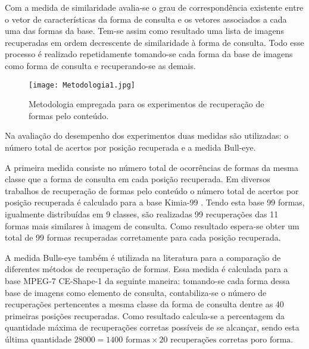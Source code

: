Com a medida de similaridade avalia-se o grau de correspondência existente entre o vetor de características da forma de consulta e os vetores associados a cada uma das formas da base. Tem-se assim como resultado uma lista de imagens recuperadas em ordem decrescente de similaridade à forma de consulta. Todo esse processo é realizado repetidamente tomando-se cada forma da base de imagens como forma de consulta e recuperando-se as demais.

\begin{figure}[h!]
  \caption{\label{fig:metodo_cbir} Metodologia empregada para os experimentos de recuperação de formas pelo conteúdo.}
  \centering
  \texttt{[image: Metodologia1.jpg]}
\end{figure}

Na avaliação do desempenho dos experimentos duas medidas são utilizadas: o número total de acertos por posição recuperada e a medida Bull-eye.

A primeira medida consiste no número total de ocorrências de formas da mesma classe que a forma de consulta em cada posição recuperada.  Em diversos trabalhos de recuperação de formas pelo conteúdo o número total de acertos por posição recuperada é calculado para a base Kimia-99 \cite{Bernier:2003}. Tendo esta base 99 formas, igualmente distribuídas em 9 classes, são realizadas 99 recuperações das 11 formas mais similares à imagem de consulta. Como resultado espera-se obter um total de 99 formas recuperadas corretamente para cada posição recuperada.

A medida Bulls-eye também é utilizada na literatura para a comparação de diferentes métodos de recuperação de formas. Essa medida é calculada para a base MPEG-7 CE-Shape-1 da seguinte maneira: tomando-se cada forma dessa base de imagens como elemento de consulta, contabiliza-se o número de recuperações pertencentes a mesma classe da forma de consulta dentre as 40 primeiras posições recuperadas. Como resultado calcula-se a percentagem da quantidade máxima de recuperações corretas possíveis de se alcançar, sendo esta última quantidade $28000 = 1400\text{ formas} \times 20\text{ recuperações corretas poro forma}$. 



